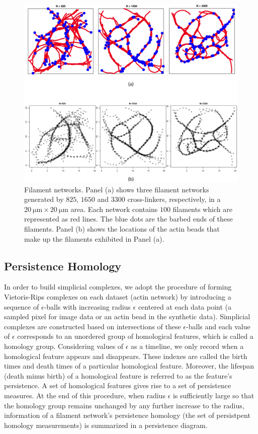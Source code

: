 \documentclass[10pt]{article}
\begin{document}
\begin{figure}[tbp]
	\begin{center}
		\includegraphics[width=1\textwidth]{rawdata.png}
	\end{center}
	\caption{Filament networks. Panel (a) shows three filament networks generated by $825$, $1650$ and $3300$ cross-linkers, respectively, in a $\SI{20}{\micro\metre} \times \SI{20}{\micro\metre}$ area. Each network contains $100$ filaments which are represented as red lines. The blue dots are the barbed ends of these filaments. Panel (b) shows the locations of the actin beads that make up the filaments exhibited in Panel (a).}
	\label{fig:rawdata}
\end{figure}

\subsection{Persistence Homology}
In order to build simplicial complexes, we adopt the procedure of forming Vietoris-Rips complexes on each dataset (actin network) by introducing a sequence of $\epsilon$-balls with increasing radius $\epsilon$ centered at each data point (a sampled pixel for image data or an actin bead in the synthetic data). Simplicial complexes are constructed based on intersections of these $\epsilon$-balls and each value of $\epsilon$ corresponds to an unordered group of homological features, which is called a homology group. Considering values of $\epsilon$ as a timeline, we only record when a homological feature appears and disappears. These indexes are called the birth times and death times of a particular homological feature. Moreover, the lifespan (death minus birth) of a homological feature is referred to as the feature's persistence. A set of homological features gives rise to a set of persistence measures. At the end of this procedure, when radius $\epsilon$ is sufficiently large so that the homology group remains unchanged by any further increase to the radius, information of a filament network's persistence homology (the set of persistpent homology measurements) is summarized in a persistence diagram.
\end{document}
